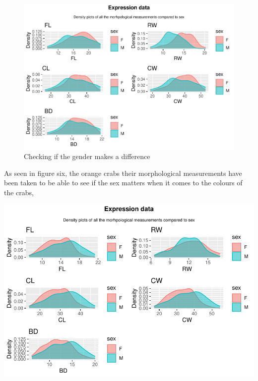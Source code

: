 \documentclass[
]{article}
\begin{document}
\begin{figure}[H]

{\centering \includegraphics{CrabProject_files/figure-latex/figure6-1} 

}

\caption{Checking if the gender makes a difference}\label{fig:figure6}
\end{figure}

As seen in figure six, the orange crabs their morphological measurements
have been taken to be able to see if the sex matters when it comes to
the colours of the crabs,

\begin{center}\includegraphics{CrabProject_files/figure-latex/figure 7-1} \end{center}
\end{document}
